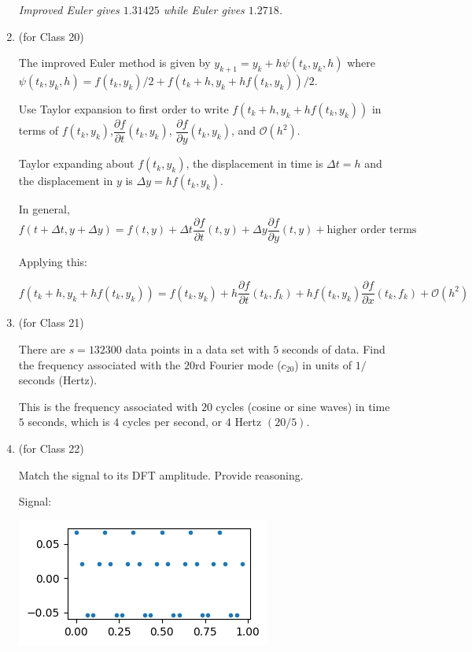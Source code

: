 \documentclass[12pt,letterpaper,answers]{exam}
\begin{document}
\begin{enumerate}
\begin{solution}
\emph{Improved Euler gives $1.31425$ while Euler gives $1.2718$.}
\end{solution}


\item (for Class 20)

The improved Euler method is given by $y_{k+1} = y_k + h\psi(t_k,y_k,h)$ where $\psi(t_k,y_k,h) = f(t_k,y_k)/2+f(t_k+h,y_k+hf(t_k,y_k))/2$.

Use Taylor expansion to first order to write $f(t_k+h,y_k+hf(t_k,y_k))$ in terms of $f(t_k, y_k)$,$\dfrac{\partial f}{\partial t}(t_k,y_k)$, $\dfrac{\partial f}{\partial y}(t_k,y_k)$, and $\mathcal{O}(h^2)$.

\begin{solution}
Taylor expanding about $f(t_k, y_k)$, the displacement in time is $\Delta t = h$ and the displacement in $y$ is $\Delta y = hf(t_k,y_k)$.

In general, $f(t+\Delta t, y+\Delta y) = f(t,y) + \Delta t \dfrac{\partial f}{\partial t}(t,y) +  \Delta y \dfrac{\partial f}{\partial y}(t,y) + \text{higher order terms}$


Applying this:

$f(t_k+h,y_k+hf(t_k,y_k)) = f(t_k,y_k) + h\dfrac{\partial f}{\partial t}(t_k,f_k) + hf(t_k,y_k) \dfrac{\partial f}{\partial x}(t_k,f_k) + \mathcal{O}(h^2)$

\end{solution}


\item (for Class 21)

There are $s = 132300$ data points in a data set with $5$ seconds of data.  Find the frequency associated with the $20$rd Fourier mode ($c_{20}$) in units of $1/$seconds (Hertz).

\begin{solution}
This is the frequency associated with $20$ cycles (cosine or sine waves) in time $5$ seconds, which is $4$ cycles per second, or $4$ Hertz $(20/5)$.
\end{solution}


\item (for Class 22)

Match the signal to its DFT amplitude.  Provide reasoning.

Signal:

\includegraphics[width=0.3\linewidth]{img/C21skill-1.png}


\end{enumerate}
\end{document}
